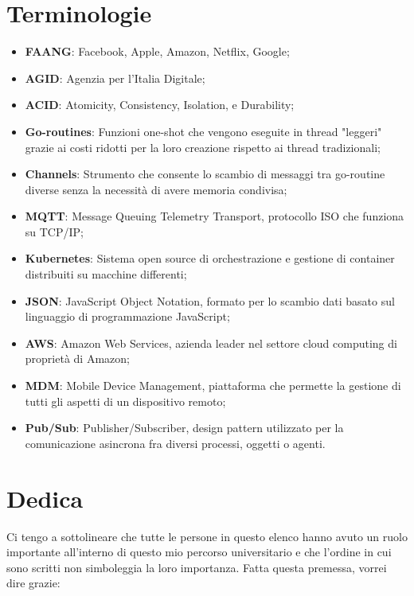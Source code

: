 \documentclass[a4paper, titlepage, 12pt, openright, twoside]{book}
\begin{document}
\chapter{Terminologie}\label{chap:terminologie}

\begin{itemize}
	\item \textbf{FAANG}: Facebook, Apple, Amazon, Netflix, Google;
	\item \textbf{AGID}: Agenzia per l'Italia Digitale;
	\item \textbf{ACID}: Atomicity, Consistency, Isolation, e Durability;
	\item \textbf{Go-routines}: Funzioni one-shot che vengono eseguite in thread "leggeri" grazie ai costi ridotti per la loro creazione rispetto ai thread tradizionali;
	\item \textbf{Channels}: Strumento che consente lo scambio di messaggi tra go-routine diverse senza la necessità di avere memoria condivisa;
	\item \textbf{MQTT}: Message Queuing Telemetry Transport, protocollo ISO che funziona su TCP/IP;
	\item \textbf{Kubernetes}: Sistema open source di orchestrazione e gestione di container distribuiti su macchine differenti;
	\item \textbf{JSON}: JavaScript Object Notation, formato per lo scambio dati basato sul linguaggio di programmazione JavaScript;
	\item \textbf{AWS}: Amazon Web Services, azienda leader nel settore cloud computing di proprietà di Amazon;
	\item \textbf{MDM}: Mobile Device Management, piattaforma che permette la gestione di tutti gli aspetti di un dispositivo remoto;
	\item \textbf{Pub/Sub}: Publisher/Subscriber, design pattern utilizzato per la comunicazione asincrona fra diversi processi, oggetti o agenti.
\end{itemize}

\chapter{Dedica}\label{chap:dedica}

Ci tengo a sottolineare che tutte le persone in questo elenco hanno avuto un ruolo importante all'interno di questo mio percorso universitario e che l'ordine in cui sono scritti non simboleggia la loro importanza. Fatta questa premessa, vorrei dire grazie:
\end{document}
